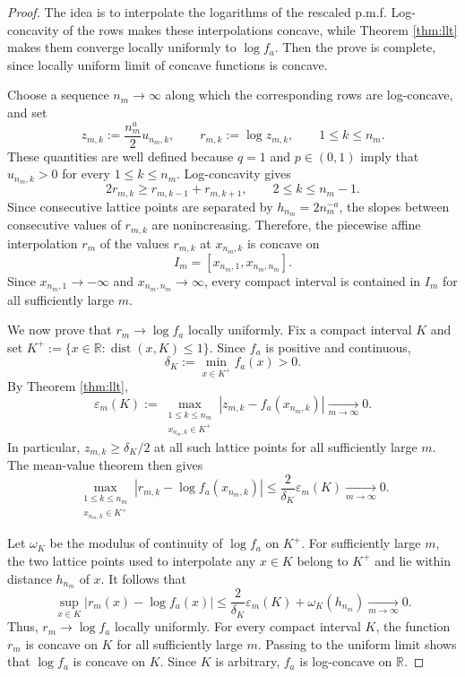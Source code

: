 \documentclass[11pt]{article}
\numberwithin{equation}{section}
\theoremstyle{remark}
\begin{document}
\begin{proof}
The idea is to interpolate the logarithms of the rescaled p.m.f. Log-concavity of the rows makes these interpolations concave,
while Theorem \ref{thm:llt} makes them converge locally uniformly to $\log f_a$. Then the prove is complete, since locally uniform limit of concave functions is concave.

Choose a sequence $n_m\to\infty$ along which the corresponding rows
are log-concave, and set
\[
z_{m,k}:=\frac{n_m^a}{2}u_{n_m,k},
\qquad
r_{m,k}:=\log z_{m,k},
\qquad 1\leq k\leq n_m.
\]
These quantities are well defined because $q=1$ and $p\in(0,1)$ imply
that $u_{n_m,k}>0$ for every $1\leq k\leq n_m$. Log-concavity gives
\[
2r_{m,k}\geq r_{m,k-1}+r_{m,k+1},
\qquad 2\leq k\leq n_m-1.
\]
Since consecutive lattice points are separated by
$h_{n_m}=2n_m^{-a}$, the slopes between consecutive values of
$r_{m,k}$ are nonincreasing. Therefore, the piecewise affine
interpolation $r_m$ of the values $r_{m,k}$ at $x_{n_m,k}$ is concave
on
\[
I_m=[x_{n_m,1},x_{n_m,n_m}].
\]
Since $x_{n_m,1}\to-\infty$ and $x_{n_m,n_m}\to\infty$, every compact
interval is contained in $I_m$ for all sufficiently large $m$.

We now prove that $r_m\to\log f_a$ locally uniformly. Fix a compact
interval $K$ and set
$K^+:=\{x\in\mathbb{R}:\operatorname{dist}(x,K)\leq1\}$. Since $f_a$
is positive and continuous,
\[
\delta_K:=\min_{x\in K^+}f_a(x)>0.
\]
By Theorem \ref{thm:llt},
\[
\varepsilon_m(K)
:=
\max_{\substack{1\leq k\leq n_m\\x_{n_m,k}\in K^+}}
\left|z_{m,k}-f_a(x_{n_m,k})\right|
\xrightarrow[m\to \infty]{} 0.
\]
In particular, $z_{m,k}\geq\delta_K/2$ at all such lattice points for
all sufficiently large $m$. The mean-value theorem then gives
\[
\max_{\substack{1\leq k\leq n_m\\x_{n_m,k}\in K^+}}
\left|r_{m,k}-\log f_a(x_{n_m,k})\right|
\leq
\frac{2}{\delta_K}\varepsilon_m(K)
\xrightarrow[m\to \infty]{} 0.
\]

Let $\omega_K$ be the modulus of continuity of $\log f_a$ on $K^+$.
For sufficiently large $m$, the two lattice points used to interpolate
any $x\in K$ belong to $K^+$ and lie within distance $h_{n_m}$ of $x$.
It follows that
\[
\sup_{x\in K}|r_m(x)-\log f_a(x)|
\leq
\frac{2}{\delta_K}\varepsilon_m(K)
+\omega_K(h_{n_m})
\xrightarrow[m\to \infty]{} 0.
\]
Thus, $r_m\to\log f_a$ locally uniformly. For every compact interval
$K$, the function $r_m$ is concave on $K$ for all sufficiently large
$m$. Passing to the uniform limit shows that $\log f_a$ is concave on
$K$. Since $K$ is arbitrary, $f_a$ is log-concave on $\mathbb{R}$.
\end{proof}
\end{document}

